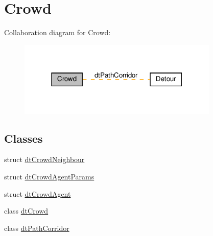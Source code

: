 \hypertarget{group__crowd}{}\section{Crowd}
\label{group__crowd}
Collaboration diagram for Crowd\+:
\nopagebreak
\begin{figure}[H]
\begin{center}
\leavevmode
\includegraphics[width=271pt]{group__crowd}
\end{center}
\end{figure}
\subsection*{Classes}
\begin{DoxyCompactItemize}
\item 
struct \hyperlink{structdtCrowdNeighbour}{dt\+Crowd\+Neighbour}
\item 
struct \hyperlink{structdtCrowdAgentParams}{dt\+Crowd\+Agent\+Params}
\item 
struct \hyperlink{structdtCrowdAgent}{dt\+Crowd\+Agent}
\item 
class \hyperlink{classdtCrowd}{dt\+Crowd}
\item 
class \hyperlink{classdtPathCorridor}{dt\+Path\+Corridor}
\end{DoxyCompactItemize}
